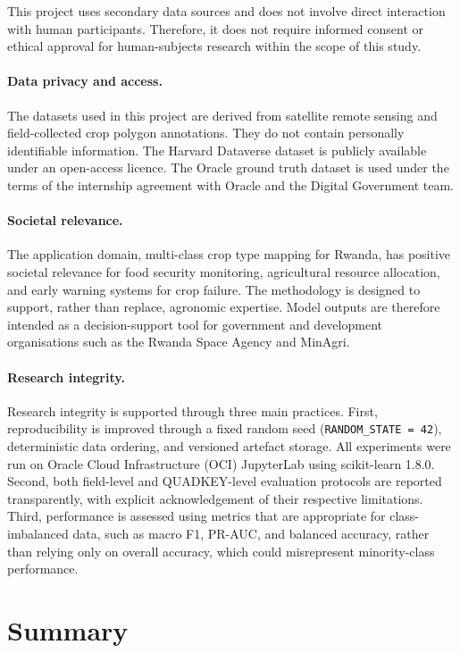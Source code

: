 This project uses secondary data sources and does not involve direct
interaction with human participants. Therefore, it does not require informed
consent or ethical approval for human-subjects research within the scope of
this study.

\paragraph{Data privacy and access.}
The datasets used in this project are derived from satellite remote sensing
and field-collected crop polygon annotations. They do not contain personally
identifiable information. The Harvard Dataverse dataset is publicly available
under an open-access licence. The Oracle ground truth dataset is used under
the terms of the internship agreement with Oracle and the Digital Government
team.

\paragraph{Societal relevance.}
The application domain, multi-class crop type mapping for Rwanda, has
positive societal relevance for food security monitoring, agricultural
resource allocation, and early warning systems for crop failure. The
methodology is designed to support, rather than replace, agronomic expertise.
Model outputs are therefore intended as a decision-support tool for
government and development organisations such as the Rwanda Space Agency and
MinAgri.

\paragraph{Research integrity.}
Research integrity is supported through three main practices. First,
reproducibility is improved through a fixed random seed
(\texttt{RANDOM\_STATE = 42}), deterministic data ordering, and versioned
artefact storage. All experiments were run on Oracle Cloud Infrastructure
(OCI) JupyterLab using scikit-learn 1.8.0. Second, both field-level and
QUADKEY-level evaluation protocols are reported transparently, with
explicit acknowledgement of their respective limitations. Third,
performance is assessed using metrics that are appropriate for
class-imbalanced data, such as macro F1, PR-AUC, and balanced accuracy,
rather than relying only on overall accuracy, which could misrepresent
minority-class performance.


\section{Summary}
\label{sec:method_summary}

